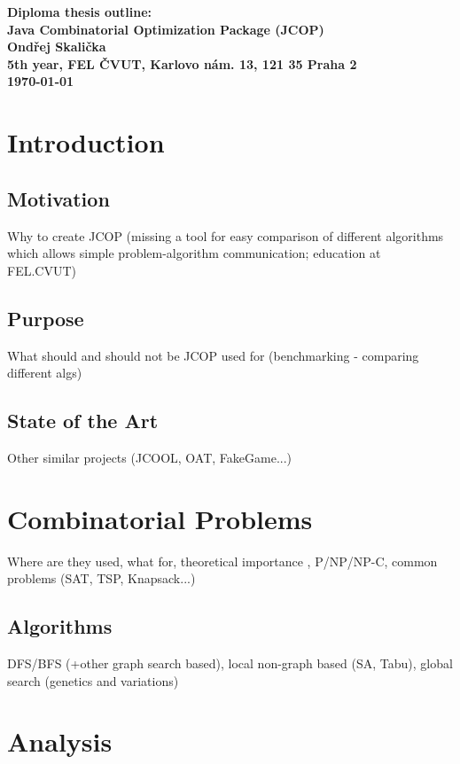 \documentclass[]{article}
\begin{document}
\begin{center}
\bf Diploma thesis outline:\\[5mm]
    Java Combinatorial Optimization Package (JCOP)\\[5mm] 
       Ondřej Skalička\\[2mm]
5th year, FEL ČVUT, Karlovo nám. 13, 121 35 Praha 2\\[2mm]
\today
\end{center}

\section{Introduction}


\subsection{Motivation}

Why to create JCOP (missing a tool for easy comparison of different algorithms which allows simple problem-algorithm communication; education at FEL.CVUT)

\subsection{Purpose}

What should and should not be JCOP used for (benchmarking - comparing different algs)

\subsection{State of the Art}

Other similar projects (JCOOL, OAT, FakeGame...)

\section{Combinatorial Problems}

Where are they used, what for, theoretical importance , P/NP/NP-C, common problems (SAT, TSP, Knapsack...)

\subsection{Algorithms}

DFS/BFS (+other graph search based), local non-graph based (SA, Tabu), global search (genetics and variations)

\section{Analysis}
\end{document}
